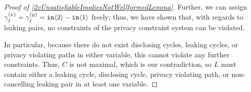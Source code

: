 \begin{proof}[Proof of \ref{2vUnsatisfiableImpliesNotWellformedLemma}]
    Further, we can assign $\gamma_j^{(x)} = \gamma_j^{(y)}=\texttt{in}\langle2 \rangle-\texttt{in}\langle1 \rangle$ freely; thus, we have shown that, with regards to leaking pairs, no constraints of the privacy constraint system can be violated.    
    
    In particular, because there do not exist disclosing cycles, leaking cycles, or privacy violating paths in either variable, this cannot violate any further constraints. Thus, $C$ is not maximal, which is our contradiction, so $L$ must contain either a leaking cycle, disclosing cycle, privacy violating path, or non-cancelling leaking pair in at least one variable.
\end{proof}

